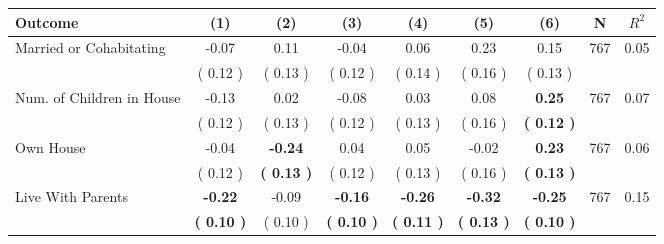 \begin{tabular}{lcccccccc}
\toprule
 \textbf{Outcome} & \textbf{(1)} & \textbf{(2)} & \textbf{(3)} & \textbf{(4)} & \textbf{(5)} & \textbf{(6)} & \textbf{N} & \textbf{$ R^2$} \\
\midrule
Married or Cohabitating &     -0.07 &      0.11 &     -0.04 &      0.06 &      0.23 &      0.15 & 767 &       0.05 \\ 
 & (     0.12 ) & (     0.13 ) & (     0.12 ) & (     0.14 ) & (     0.16 ) & (     0.13 ) & \\
Num. of Children in House &     -0.13 &      0.02 &     -0.08 &      0.03 &      0.08 & \textbf{     0.25} & 767 &       0.07 \\ 
 & (     0.12 ) & (     0.13 ) & (     0.12 ) & (     0.13 ) & (     0.16 ) & \textbf{(     0.12 )} & \\
Own House &     -0.04 & \textbf{    -0.24} &      0.04 &      0.05 &     -0.02 & \textbf{     0.23} & 767 &       0.06 \\ 
 & (     0.12 ) & \textbf{(     0.13 )} & (     0.12 ) & (     0.13 ) & (     0.16 ) & \textbf{(     0.13 )} & \\
Live With Parents & \textbf{    -0.22} &     -0.09 & \textbf{    -0.16} & \textbf{    -0.26} & \textbf{    -0.32} & \textbf{    -0.25} & 767 &       0.15 \\ 
 & \textbf{(     0.10 )} & (     0.10 ) & \textbf{(     0.10 )} & \textbf{(     0.11 )} & \textbf{(     0.13 )} & \textbf{(     0.10 )} & \\
\bottomrule
\end{tabular}
